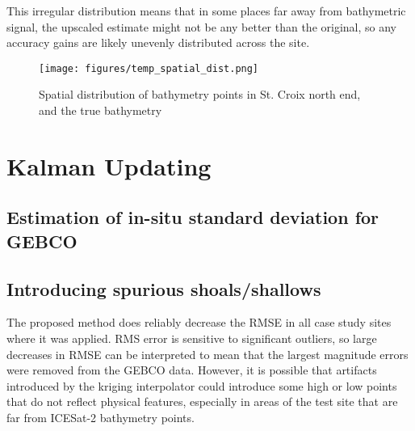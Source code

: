 This irregular distribution means that in some places far away from bathymetric signal, the upscaled estimate might not be any better than the original, so any accuracy gains are likely unevenly distributed across the site. 


\begin{figure}[h!]
    \centering
    \texttt{[image: figures/temp\_spatial\_dist.png]}
    \caption{Spatial distribution of bathymetry points in St. Croix north end, and the true bathymetry}
    \label{fig:distribution-of-bathy-points-in-space}
\end{figure}


\section{Kalman Updating}

\subsection{Estimation of in-situ standard deviation for GEBCO}





\subsection{Introducing spurious shoals/shallows}

The proposed method does reliably decrease the RMSE in all case study sites where it was applied. RMS error is sensitive to significant outliers, so large decreases in RMSE can be interpreted to mean that the largest magnitude errors were removed from the GEBCO data. However, it is possible that artifacts introduced by the kriging interpolator could introduce some high or low points that do not reflect physical features, especially in areas of the test site that are far from ICESat-2 bathymetry points.